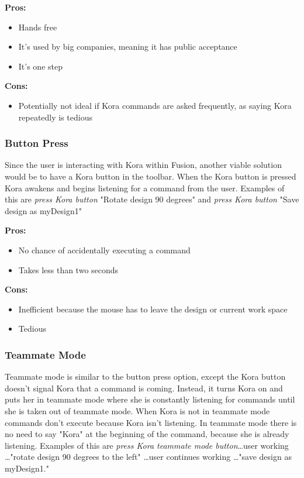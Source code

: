 \documentclass[onecolumn, draftclsnofoot,10pt, compsoc]{IEEEtran}
\begin{document}
	\textbf{Pros:}
	\begin{itemize}
		\item{
			Hands free}
		\item{
			It's used by big companies, meaning it has public acceptance}
		\item{
			It's one step}
	\end{itemize}

	\textbf{Cons:}
	\begin{itemize}
		\item{
			Potentially not ideal if Kora commands are asked frequently, as saying Kora repeatedly is tedious}
	\end{itemize}


	\subsubsection{Button Press}
	Since the user is interacting with Kora within Fusion, another viable solution would be to have a Kora button in the toolbar.
	When the Kora button is pressed Kora awakens and begins listening for a command from the user.
	Examples of this are \textit{press Kora button} "Rotate design 90 degrees" and  \textit{press Kora button} "Save design as myDesign1"

	\textbf{Pros:}
	\begin{itemize}
		\item{
			No chance of accidentally executing a command}
		\item{
			Takes less than two seconds}
	\end{itemize}

	\textbf{Cons:}
	\begin{itemize}
		\item{
			Inefficient because the mouse has to leave the design or current work space}
		\item{
			Tedious}
	\end{itemize}


	\subsubsection{Teammate Mode}
	Teammate mode is similar to the button press option, except the Kora button doesn't signal Kora that a command is coming.
	Instead, it turns Kora on and puts her in teammate mode where she is constantly listening for commands until she is taken out of teammate mode.
	When Kora is not in teammate mode commands don't execute because Kora isn't listening.
	In teammate mode there is no need to say "Kora" at the beginning of the command, because she is already listening.
	Examples of this are \textit{press Kora teammate mode button}\dots user working \dots "rotate design 90 degrees to the left" \dots user continues working \dots"save design as myDesign1."
\end{document}
